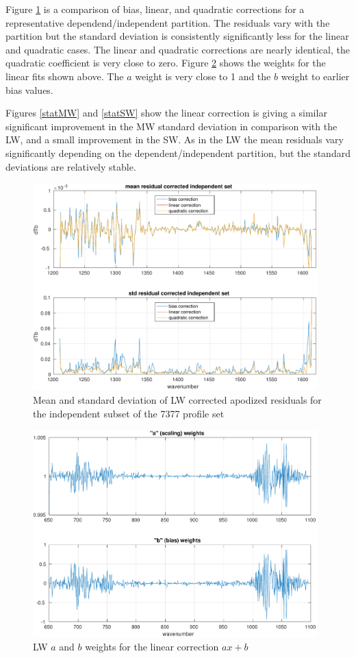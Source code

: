 \documentclass[12pt]{article}
\begin{document}
Figure \ref{statLW} is a comparison of bias, linear, and quadratic
corrections for a representative dependend/independent partition.
The residuals vary with the partition but the standard deviation is
consistently significantly less for the linear and quadratic cases.
The linear and quadratic corrections are nearly identical, the
quadratic coefficient is very close to zero.  Figure \ref{coefLW}
shows the weights for the linear fits shown above.  The $a$ weight
is very close to 1 and the $b$ weight to earlier bias values.

Figures \ref{statMW} and \ref{statSW} show the linear correction 
is giving a similar significant improvement in the MW standard
deviation in comparison with the LW, and a small improvement in the
SW.  As in the LW the mean residuals vary significantly depending on
the dependent/independent partition, but the standard deviations are
relatively stable.

\begin{figure} %
  \centering
  \includegraphics[height=8cm]{figures/a2cris_stat_LW.pdf}
  \caption{Mean and standard deviation of LW corrected apodized
    residuals for the independent subset of the 7377 profile set}
  \label{statLW}
\end{figure}

\begin{figure} %
  \centering
  \includegraphics[height=8cm]{figures/a2cris_coef_LW.pdf}
  \caption{LW $a$ and $b$ weights for the linear correction $ax+b$}
  \label{coefLW}
\end{figure}
\end{document}
